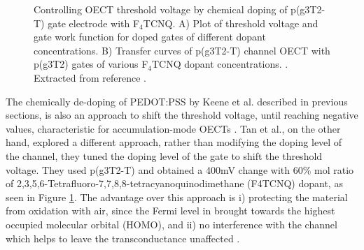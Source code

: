  \begin{figure}[h]
	\centering
	\hspace{2em}
	\caption[Tuning of threshold voltage with different levels of doping p(g3T2-T)]{Controlling OECT threshold voltage by chemical doping of p(g3T2-T) gate electrode with F$_{4}$TCNQ. A) Plot of threshold voltage and gate work function for doped gates of different dopant concentrations. B) Transfer curves of p(g3T2-T) channel OECT %
		with p(g3T2) gates of various F$_{4}$TCNQ dopant concentrations. . Extracted from reference \cite{tanTuningOrganicElectrochemical2022}.}
	\label{fig:tune}
\end{figure}

The chemically de-doping of PEDOT:PSS by Keene et al. described in previous sections, is also an approach to shift the threshold voltage, until reaching negative values, characteristic for accumulation-mode OECTs \cite{keeneEnhancementModePEDOTPSS2020}. Tan et al., on the other hand, explored a different approach, rather than modifying the doping level of the channel, they tuned the doping level of the gate to shift the threshold voltage. They used p(g3T2-T) and obtained a 400mV change with 60\% mol ratio of 2,3,5,6-Tetrafluoro-7,7,8,8-tetracyanoquinodimethane (F4TCNQ) dopant, as seen in Figure \ref{fig:tune}. The advantage over this approach is i) protecting the material from oxidation with air, since the Fermi level in brought towards the highest occupied molecular orbital (HOMO), and ii) no interference with the channel which helps to leave the transconductance unaffected \cite{tanTuningOrganicElectrochemical2022}.


